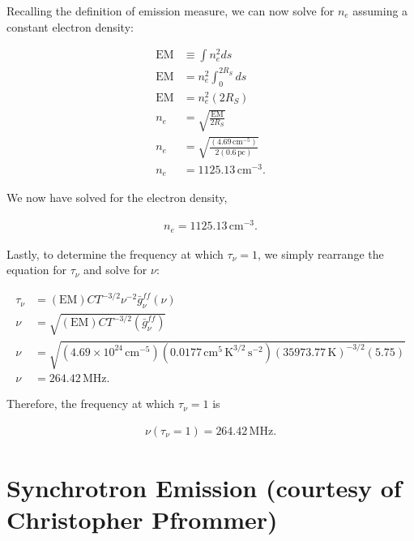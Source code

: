 \documentclass[12pt]{article}
\begin{document}
{\noindent}Recalling the definition of emission measure, we can now solve for $n_e$ assuming a constant electron density:

\begin{equation*}
\begin{split}
\mathrm{EM} &\equiv \int n_e^2 ds \\
\mathrm{EM} &= n_e^2 \int_0^{2R_S} ds \\
\mathrm{EM} &= n_e^2 (2R_S) \\
n_e &= \sqrt{\frac{\mathrm{EM}}{2R_S}} \\
n_e &= \sqrt{\frac{\mathrm{(4.69\,\mathrm{cm^{-5}})}}{2(0.6\,\mathrm{pc})}} \\
n_e &= 1125.13\,\mathrm{cm^{-3}}.
\end{split}
\end{equation*}

{\noindent}We now have solved for the electron density,

\begin{align*}
    \boxed{n_e = 1125.13\,\mathrm{cm^{-3}}}.
\end{align*}

{\noindent}Lastly, to determine the frequency at which $\tau_\nu = 1$, we simply rearrange the equation for $\tau_\nu$ and solve for $\nu$:


\begin{equation*}
\begin{split}
\tau_\nu &= \mathrm{(EM)} C T^{-3/2} \nu^{-2}\bar{g}_\nu^{ff}(\nu) \\
\nu &= \sqrt{\mathrm{(EM)} C T^{-3/2} (\bar{g}_\nu^{ff})} \\
\nu &= \sqrt{\mathrm{(4.69\times10^{24}\,\mathrm{cm^{-5}})} (0.0177\,\mathrm{cm^5\,K^{3/2}\,s^{-2}}) (35973.77\,\mathrm{K})^{-3/2} (5.75)} \\ 
\nu &= 264.42 \,\mathrm{MHz}.
\end{split}
\end{equation*}

{\noindent}Therefore, the frequency at which $\tau_\nu=1$ is

\begin{align*}
    \boxed{\nu(\tau_\nu = 1) = 264.42 \,\mathrm{MHz}}.
\end{align*}


\section{Synchrotron Emission (courtesy of Christopher Pfrommer)}
\end{document}
